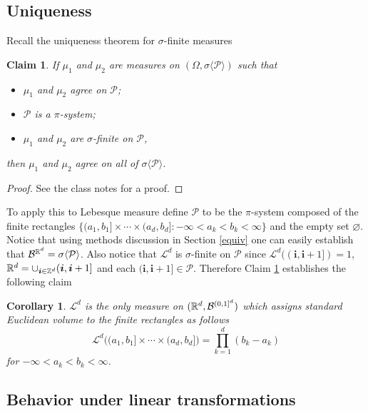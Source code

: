 \documentclass[10pt,letterpaper,twocolumn]{article}
\newtheorem{corollary}{Corollary}
\newtheorem{claim}{Claim}
\newcommand{\bs}{\boldsymbol}
\begin{document}
\subsection{Uniqueness}
Recall the uniqueness theorem for $\sigma$-finite measures
\begin{claim}
\label{ui}
If $\mu_1$ and $\mu_2$ are measures on $(\Omega, \sigma\langle \mathcal P\rangle)$ such that
\begin{itemize}
\item[(a)] $\mu_1$ and $\mu_2$ agree on $\mathcal P$;
\item[(b)] $\mathcal P$ is a $\pi$-system;
\item[(c)] $\mu_1$ and $\mu_2$ are $\sigma$-finite on $\mathcal P$,
\end{itemize}
then $\mu_1$ and $\mu_2$ agree on all of $ \sigma\langle \mathcal P\rangle$.
\end{claim}
\begin{proof}
See the class notes for a proof.
\end{proof}

To apply this to Lebesque measure define $\mathcal P$ to be the $\pi$-system composed of the finite rectangles $\{ (a_1,b_1]\times \cdots \times (a_d,b_d]: -\infty < a_k < b_k <\infty\}$ and the empty set $\varnothing$. Notice that using methods discussion in Section \ref{equiv} one can easily establish that $\mathcal B^{\Bbb R^d}=\sigma\langle\mathcal P\rangle$.
 Also notice that $\mathcal L^d$ is $\sigma$-finite on $\mathcal P$ since  $\mathcal L^d\bigl((\bs i,\bs i+1])=1$, $\Bbb R^d = \cup_{\bs i\in\Bbb Z^d} (\bs i,\bs i+1]$ and each $(\bs i,\bs i+1]\in \mathcal P$.
 Therefore Claim \ref{ui} establishes the following claim

 \begin{corollary}
 \label{ui2}
  $\mathcal L^d$ is the only measure on $(\Bbb R^d,\mathcal B^{(0,1]^d})$ which assigns standard Euclidean volume to the finite rectangles as follows
 \begin{equation}
\mathcal L^d \bigl( (a_1,b_1]\times \cdots \times (a_d,b_d]\bigr)=\prod_{k=1}^d (b_k - a_k)
\end{equation}
for $-\infty < a_k < b_k <\infty$.
\end{corollary}


\subsection{Behavior under linear transformations}
\end{document}
